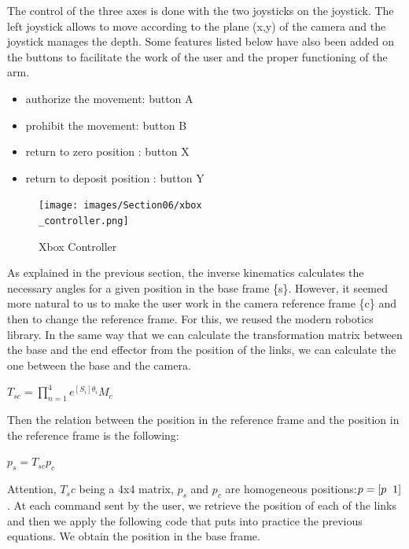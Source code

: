 \bigbreak
The control of the three axes is done with the two joysticks on the joystick. The left joystick allows to move according to the plane (x,y) of the camera and the joystick manages the depth. Some features listed below have also been added on the buttons to facilitate the work of the user and the proper functioning of the arm.
\begin{itemize}[noitemsep]
    \item authorize the movement: button A
    \item prohibit the movement: button B
    \item return to zero position : button X
    \item return to deposit position : button Y
\end{itemize}

\begin{figure}[ht]
    \centering
    \texttt{[image: images/Section06/xbox\\\_controller.png]}
    \caption{Xbox Controller}
    \label{fig:mesh18}
\end{figure}
\FloatBarrier

\bigbreak
As explained in the previous section, the inverse kinematics calculates the necessary angles for a given position in the base frame \{s\}. However, it seemed more natural to us to make the user work in the camera reference frame \{c\} and then to change the reference frame. For this, we reused the modern robotics library. In the same way that we can calculate the transformation matrix between the base and the end effector from the position of the links, we can calculate the one between the base and the camera. 
\begin{center}
    $T_{sc} =\displaystyle \prod_{n=1}^4e^{[S_i]\theta_i}M_c$
\end{center}

\bigbreak
Then the relation between the position in the reference frame and the position in the reference frame is the following:
\begin{center}
    $p_s = T_{sc}p_c$
\end{center}

\bigbreak
Attention, $T_sc$ being a 4x4 matrix, $p_s$ and $p_c$ are homogeneous positions:$p = [p\hspace{0.2cm}1]$. At each command sent by the user, we retrieve the position of each of the links and then we apply the following code that puts into practice the previous equations. We obtain the position in the base frame.

